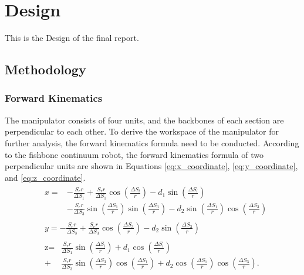 \section{Design} 
This is the Design of the final report.
\subsection{Methodology}
\subsubsection{Forward Kinematics}
The manipulator consists of four units, and the backbones of each section are perpendicular to each other. To derive the 
workspace of the manipulator for further analysis, the forward kinematics formula need to be conducted. According to the 
fishbone continuum robot\cite{fishboneCR}, the forward kinematics formula of two perpendicular units are shown in 
Equations \ref{eq:x_coordinate}, \ref{eq:y_coordinate}, and \ref{eq:z_coordinate}.
\begin{align}
    &\begin{aligned}
    x=&-\frac{S_{r}r}{\Delta S_{1}}+\frac{S_{r}r}{\Delta S_{1}}\cos\left(\frac{\Delta S_{l}}{r}\right)-d_{1}\sin\left(\frac{\Delta S_{l}}{r}\right) \\
    &-\frac{S_{r}r}{\Delta S_{3}}\sin\left(\frac{\Delta S_{1}}{r}\right)\sin\left(\frac{\Delta S_{3}}{r}\right)-d_{2}\sin\left(\frac{\Delta S_{1}}{r}\right)\cos\left(\frac{\Delta S_{3}}{r}\right) 
    \end{aligned}
    \label{eq:x_coordinate} \\
    &\begin{aligned}
        y=-\frac{S_rr}{\Delta S_3}+\frac{S_rr}{\Delta S_3}\cos\left(\frac{\Delta S_3}{r}\right)-d_2\sin\left(\frac{\Delta S_3}{r}\right)
    \end{aligned}
    \label{eq:y_coordinate} \\
    &\begin{aligned}
        \text{z} =&\frac{S_{r}r}{\Delta S_{1}}\sin\left(\frac{\Delta S_{\mathrm{l}}}{r}\right)+d_{1}\cos\left(\frac{\Delta S_{\mathrm{l}}}{r}\right) \\
        +&\frac{S_{r}r}{\Delta S_{3}}\sin\left(\frac{\Delta S_{3}}{r}\right)\cos\left(\frac{\Delta S_{1}}{r}\right)+d_{2}\cos\left(\frac{\Delta S_{1}}{r}\right)\cos\left(\frac{\Delta S_{3}}{r}\right). 
    \end{aligned}
    \label{eq:z_coordinate}
\end{align}
